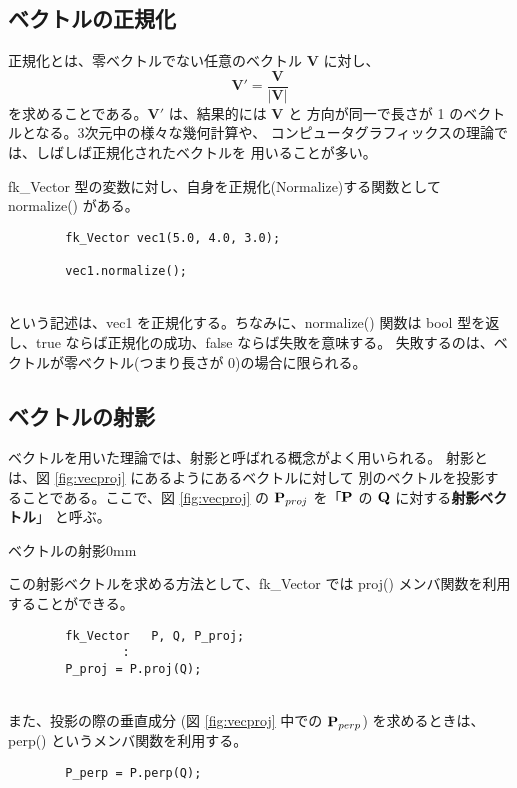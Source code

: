 \subsection{ベクトルの正規化}
正規化とは、零ベクトルでない任意のベクトル \(\mathbf{V}\) に対し、
\[
	\mathbf{V}' = \frac{\mathbf{V}}{|\mathbf{V}|}
\]
を求めることである。\(\mathbf{V}'\) は、結果的には \(\mathbf{V}\) と
方向が同一で長さが 1 のベクトルとなる。3次元中の様々な幾何計算や、
コンピュータグラフィックスの理論では、しばしば正規化されたベクトルを
用いることが多い。

fk\_Vector 型の変数に対し、自身を正規化(Normalize)する関数として
normalize() がある。
\\
\begin{screen}
\begin{verbatim}
        fk_Vector vec1(5.0, 4.0, 3.0);

        vec1.normalize();
\end{verbatim}
\end{screen}
~ \\
という記述は、vec1 を正規化する。ちなみに、normalize() 関数は
bool 型を返し、true ならば正規化の成功、false ならば失敗を意味する。
失敗するのは、ベクトルが零ベクトル(つまり長さが 0)の場合に限られる。

\subsection{ベクトルの射影}
ベクトルを用いた理論では、射影と呼ばれる概念がよく用いられる。
射影とは、図 \ref{fig:vecproj} にあるようにあるベクトルに対して
別のベクトルを投影することである。ここで、図 \ref{fig:vecproj}
の \(\mathbf{P}_{proj}\) を「\(\mathbf{P}\) の \(\mathbf{Q}\) に対する\textbf{射影ベクトル}」
と呼ぶ。

	{ベクトルの射影}{0mm}

この射影ベクトルを求める方法として、fk\_Vector では
proj() メンバ関数を利用することができる。
\\
\begin{screen}
\begin{verbatim}
        fk_Vector   P, Q, P_proj;
                :
        P_proj = P.proj(Q);
\end{verbatim}
\end{screen}
~ \\	
また、投影の際の垂直成分 (図 \ref{fig:vecproj} 中での \(\mathbf{P}_{perp}\))
を求めるときは、perp() というメンバ関数を利用する。
\\
\begin{screen}
\begin{verbatim}
        P_perp = P.perp(Q);
\end{verbatim}
\end{screen}
